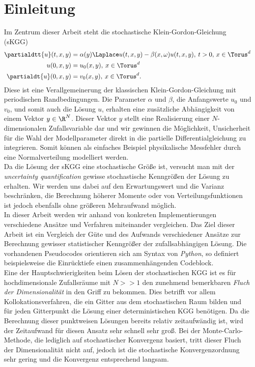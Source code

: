 
\chapter{Einleitung}
Im Zentrum dieser Arbeit steht die stochastische Klein-Gordon-Gleichung (sKGG)
\begin{align*}
\partialdtt{u}(t,x,y)&=\alpha(y) \Laplace u(t,x,y) - \beta(x,\omega)u(t,x,y), \: t>0, \, x\in \Torus^d\\
u(0,x,y)&=u_0(x,y), \: x\in \Torus^d\\
\partialdt{u}(0,x,y)&=v_0(x,y), \: x\in \Torus^d.
\end{align*}
Diese ist eine Verallgemeinerung der klassischen Klein-Gordon-Gleichung mit periodischen Randbedingungen. Die Parameter $\alpha$ und $\beta$, die Anfangswerte $u_0$ und $v_0$, und somit auch die Lösung $u$, erhalten eine zusätzliche Abhängigkeit von einem Vektor $y\in\R^N$. Dieser Vektor $y$ stellt eine Realisierung einer $N$-dimensionalen Zufallsvariable dar und wir gewinnen die Möglichkeit, Unsicherheit für die Wahl der Modellparameter direkt in die partielle Differentialgleichung zu integrieren. Somit können als einfaches Beispiel physikalische Messfehler durch eine Normalverteilung modelliert werden.\\[0.2cm]
Da die Lösung der sKGG eine stochastische Größe ist, versucht man mit der \emph{uncertainty quantification} gewisse stochastische Kenngrößen der Lösung zu erhalten. Wir werden uns dabei auf den Erwartungswert und die Varianz beschränken, die Berechnung höherer Momente oder von Verteilungsfunktionen ist jedoch ebenfalls ohne größeren Mehraufwand möglich.\\In dieser Arbeit werden wir anhand von konkreten Implementierungen verschiedene Ansätze und Verfahren miteinander vergleichen. Das Ziel dieser Arbeit ist ein Vergleich der Güte und des Aufwands verschiedener Ansätze zur Berechnung gewisser statistischer Kenngrößer der zufallsabhängigen Lösung. Die vorhandenen Pseudocodes orientieren sich am Syntax von \emph{Python}, so definiert beispielsweise die Einrücktiefe einen zusammenhängenden Codeblock.\\
Eine der Hauptschwierigkeiten beim Lösen der stochastischen KGG ist es für hochdimensionale Zufallsräume mit $N>>1$ den zunehmend bemerkbaren \emph{Fluch der Dimensionalität} in den Griff zu bekommen. Dies betrifft vor allem Kollokationsverfahren, die ein Gitter aus dem stochastischen Raum bilden und für jeden Gitterpunkt die Lösung einer deterministischen KGG benötigen. Da die Berechnung dieser punktweisen Lösungen bereits relativ zeitaufwändig ist, wird der Zeitaufwand für diesen Ansatz sehr schnell sehr groß. Bei der Monte-Carlo-Methode, die lediglich auf stochastischer Konvergenz basiert, tritt dieser Fluch der Dimensionalität nicht auf, jedoch ist die stochastische Konvergenzordnung sehr gering und die Konvergenz entsprechend langsam.\\
